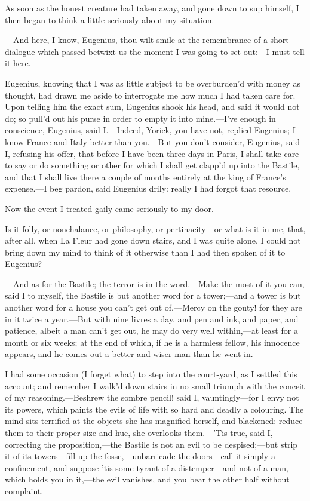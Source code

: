 \documentclass[twoside]{article}
\begin{document}
As soon as the honest creature had taken away, and gone down to sup
himself, I then began to think a little seriously about my situation.—

—And here, I know, Eugenius, thou wilt smile at the remembrance of a
short dialogue which passed betwixt us the moment I was going to set
out:—I must tell it here.

Eugenius, knowing that I was as little subject to be overburden’d with
money as thought, had drawn me aside to interrogate me how much I had
taken care for.  Upon telling him the exact sum, Eugenius shook his head,
and said it would not do; so pull’d out his purse in order to empty it
into mine.—I’ve enough in conscience, Eugenius, said I.—Indeed, Yorick,
you have not, replied Eugenius; I know France and Italy better than
you.—But you don’t consider, Eugenius, said I, refusing his offer, that
before I have been three days in Paris, I shall take care to say or do
something or other for which I shall get clapp’d up into the Bastile, and
that I shall live there a couple of months entirely at the king of
France’s expense.—I beg pardon, said Eugenius drily: really I had forgot
that resource.

Now the event I treated gaily came seriously to my door.

Is it folly, or nonchalance, or philosophy, or pertinacity—or what is it
in me, that, after all, when La Fleur had gone down stairs, and I was
quite alone, I could not bring down my mind to think of it otherwise than
I had then spoken of it to Eugenius?

—And as for the Bastile; the terror is in the word.—Make the most of it
you can, said I to myself, the Bastile is but another word for a
tower;—and a tower is but another word for a house you can’t get out
of.—Mercy on the gouty! for they are in it twice a year.—But with nine
livres a day, and pen and ink, and paper, and patience, albeit a man
can’t get out, he may do very well within,—at least for a month or six
weeks; at the end of which, if he is a harmless fellow, his innocence
appears, and he comes out a better and wiser man than he went in.

I had some occasion (I forget what) to step into the court-yard, as I
settled this account; and remember I walk’d down stairs in no small
triumph with the conceit of my reasoning.—Beshrew the sombre pencil! said
I, vauntingly—for I envy not its powers, which paints the evils of life
with so hard and deadly a colouring.  The mind sits terrified at the
objects she has magnified herself, and blackened: reduce them to their
proper size and hue, she overlooks them.—’Tis true, said I, correcting
the proposition,—the Bastile is not an evil to be despised;—but strip it
of its towers—fill up the fosse,—unbarricade the doors—call it simply a
confinement, and suppose ’tis some tyrant of a distemper—and not of a
man, which holds you in it,—the evil vanishes, and you bear the other
half without complaint.
\end{document}
